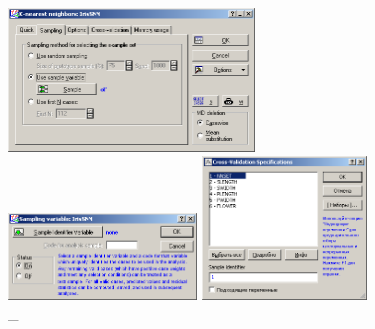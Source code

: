 \begin{figure}[!h]
  \centering

  \begin{minipage}{0.32\textwidth}
    \centering

    \includegraphics[height=3.8cm]
    {inc/ex_5.PNG}

    \caption{\_}

    \label{fig:5}
  \end{minipage}
  \begin{minipage}{0.42\textwidth}
    \centering

    \includegraphics[width=5cm]
    {inc/ex_6.PNG}

    \caption{\_}

    \label{fig:6}
  \end{minipage}
  \begin{minipage}{0.22\textwidth}
    \centering

    \includegraphics[height=3.8cm]
    {inc/ex_7.PNG}

    \caption{\_}

    \label{fig:7}
  \end{minipage}
\end{figure}

